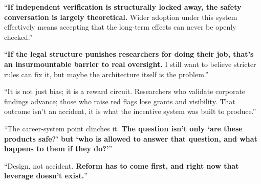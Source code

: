 \begin{casebox}
``\textbf{If independent verification is structurally locked away, the safety conversation is largely theoretical.} Wider adoption under this system effectively means accepting that the long-term effects can never be openly checked.''

``\textbf{If the legal structure punishes researchers for doing their job, that's an insurmountable barrier to real oversight.} I still want to believe stricter rules can fix it, but maybe the architecture itself is the problem.''


\textcolor{malRed}{``It is not just bias; it is a reward circuit. Researchers who validate corporate findings advance; those who raise red flags lose grants and visibility. That outcome isn't an accident, it is what the incentive system was built to produce.''}

``The career-system point clinches it. \textbf{The question isn't only `are these products safe?' but `who is allowed to answer that question, and what happens to them if they do?'}''

``Design, not accident. \textbf{Reform has to come first, and right now that leverage doesn't exist.}''

\end{casebox}
